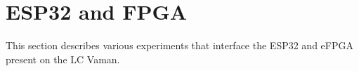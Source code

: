 \section{ESP32 and FPGA}
This section describes various experiments that interface the ESP32 and eFPGA
present on the LC Vaman.

